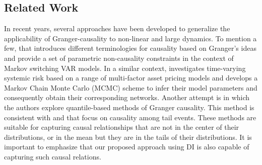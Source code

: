
\subsection{Related Work}
In recent years, several approaches have been developed to generalize the applicability of Granger-causality to non-linear and large dynamics. 
To mention a few, \citet{psaradakis2005markov} that introduces different terminologies for causality based on Granger’s ideas and provide a set of parametric non-causality constraints in the context of Markov switching VAR models.
In a similar context, \citet{bianchi2019modeling} investigates time-varying systemic risk based on a range of multi-factor asset pricing models and develops a Markov Chain Monte Carlo (MCMC) scheme to infer their model parameters and consequently obtain their corresponding networks.
Another attempt is \citet{bonaccolto2019estimation} in which the authors explore quantile-based methods of Granger causality.
This method is consistent with \citet{hong2009granger} and \citet{corsi2018measuring} that focus on causality among tail events. 
These methods are suitable for capturing causal relationships that are not in the center of their distributions, or in the mean but they are in the tails of their distributions.
It is important to emphasize that our proposed approach using DI is also capable of capturing such causal relations. 

